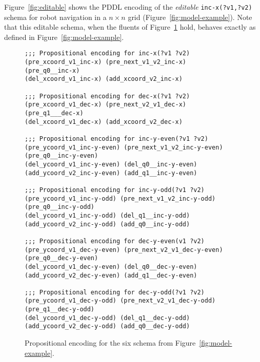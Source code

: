 \documentclass[letterpaper]{article} %
\begin{document}
Figure~\ref{fig:editable} shows the PDDL encoding of the {\em editable} {\tt\small inc-x(?v1,?v2)} schema for robot navigation in a $n\times n$ grid (Figure~\ref{fig:model-example}). Note that this editable schema, when the fluents of Figure~\ref{fig:encoding} hold, behaves exactly as defined in Figure~\ref{fig:model-example}. 

\begin{figure}
\begin{tiny}
\begin{verbatim}
;;; Propositional encoding for inc-x(?v1 ?v2)
(pre_xcoord_v1_inc-x) (pre_next_v1_v2_inc-x) 
(pre_q0__inc-x)
(del_xcoord_v1_inc-x) (add_xcoord_v2_inc-x)

;;; Propositional encoding for dec-x(?v1 ?v2)
(pre_xcoord_v1_dec-x) (pre_next_v2_v1_dec-x) 
(pre_q1___dec-x)
(del_xcoord_v1_dec-x) (add_xcoord_v2_dec-x)

;;; Propositional encoding for inc-y-even(?v1 ?v2)
(pre_ycoord_v1_inc-y-even) (pre_next_v1_v2_inc-y-even)
(pre_q0__inc-y-even)
(del_ycoord_v1_inc-y-even) (del_q0__inc-y-even)
(add_ycoord_v2_inc-y-even) (add_q1__inc-y-even)

;;; Propositional encoding for inc-y-odd(?v1 ?v2)
(pre_ycoord_v1_inc-y-odd) (pre_next_v1_v2_inc-y-odd) 
(pre_q0__inc-y-odd)
(del_ycoord_v1_inc-y-odd) (del_q1__inc-y-odd)
(add_ycoord_v2_inc-y-odd) (add_q0__inc-y-odd)

;;; Propositional encoding for dec-y-even(v1 ?v2)
(pre_ycoord_v1_dec-y-even) (pre_next_v2_v1_dec-y-even)
(pre_q0__dec-y-even)
(del_ycoord_v1_dec-y-even) (del_q0__dec-y-even)
(add_ycoord_v2_dec-y-even) (add_q1__dec-y-even)

;;; Propositional encoding for dec-y-odd(?v1 ?v2)
(pre_ycoord_v1_dec-y-odd) (pre_next_v2_v1_dec-y-odd)
(pre_q1__dec-y-odd)
(del_ycoord_v1_dec-y-odd) (del_q1__dec-y-odd)
(add_ycoord_v2_dec-y-odd) (add_q0__dec-y-odd)
\end{verbatim}
\end{tiny}
 \caption{\small Propositional encoding for the six schema from Figure~\ref{fig:model-example}.}
\label{fig:encoding}
\end{figure}
\end{document}
